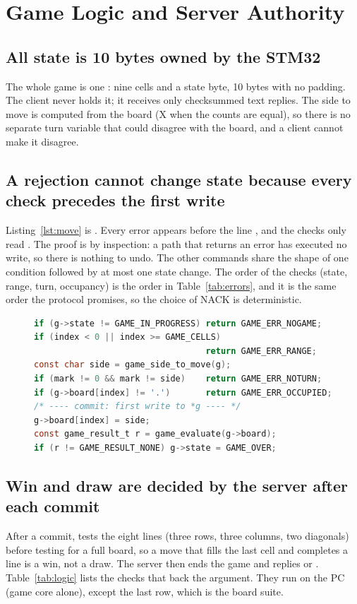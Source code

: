 \section{Game Logic and Server Authority}
\label{sec:authority}

\subsection{All state is 10 bytes owned by the STM32}
The whole game is one : nine cells and a state byte, 10 bytes with no padding. The client never holds it; it receives
only checksummed text replies. The side to move is computed from the board (X when the counts are equal), so there is no separate turn variable that could
disagree with the board, and a client cannot make it disagree.

\subsection{A rejection cannot change state because every check precedes the first write}
Listing~\ref{lst:move} is . Every error  appears before the line , and the
checks only read . The proof is by inspection: a path that returns an error has executed no write, so there is nothing to undo.
The other commands share the shape of one condition followed by at most one state change. The order of the checks (state, range, turn,
occupancy) is the order in Table~\ref{tab:errors}, and it is the same order the protocol promises, so the choice of NACK is deterministic.

\begin{figure}[t]
\begin{lstlisting}[float=false,language=C, caption={Validate-then-commit (\texttt{game.c}, comments trimmed).}, label=lst:move]
if (g->state != GAME_IN_PROGRESS) return GAME_ERR_NOGAME;
if (index < 0 || index >= GAME_CELLS)
                                  return GAME_ERR_RANGE;
const char side = game_side_to_move(g);
if (mark != 0 && mark != side)    return GAME_ERR_NOTURN;
if (g->board[index] != '.')       return GAME_ERR_OCCUPIED;
/* ---- commit: first write to *g ---- */
g->board[index] = side;
const game_result_t r = game_evaluate(g->board);
if (r != GAME_RESULT_NONE) g->state = GAME_OVER;
\end{lstlisting}
\end{figure}

\subsection{Win and draw are decided by the server after each commit}
After a commit,  tests the eight lines (three rows, three columns, two diagonals) before testing for a full board, so a move
that fills the last cell and completes a line is a win, not a draw. The server then ends the game and replies  or .
Table~\ref{tab:logic} lists the checks that back the argument. They run on the PC (game core alone), except the last row, which is the board suite.

